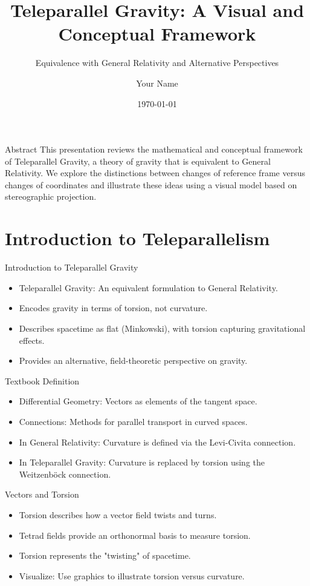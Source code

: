 \documentclass{beamer}
\title{Teleparallel Gravity: A Visual and Conceptual Framework}
\subtitle{Equivalence with General Relativity and Alternative Perspectives}
\author{Your Name}
\institute{Your Institution}
\date{\today}
\begin{document}
\begin{frame}
  \titlepage
\end{frame}

\begin{frame}{Abstract}
This presentation reviews the mathematical and conceptual framework of Teleparallel Gravity, a theory of gravity that is equivalent to General Relativity. We explore the distinctions between changes of reference frame versus changes of coordinates and illustrate these ideas using a visual model based on stereographic projection.
\end{frame}

\section{Introduction to Teleparallelism}

\begin{frame}{Introduction to Teleparallel Gravity}
  \begin{itemize}
    \item Teleparallel Gravity: An equivalent formulation to General Relativity.
    \item Encodes gravity in terms of torsion, not curvature.
    \item Describes spacetime as flat (Minkowski), with torsion capturing gravitational effects.
    \item Provides an alternative, field-theoretic perspective on gravity.
  \end{itemize}
\end{frame}

\begin{frame}{Textbook Definition}
  \begin{itemize}
    \item Differential Geometry: Vectors as elements of the tangent space.
    \item Connections: Methods for parallel transport in curved spaces.
    \item In General Relativity: Curvature is defined via the Levi-Civita connection.
    \item In Teleparallel Gravity: Curvature is replaced by torsion using the Weitzenböck connection.
  \end{itemize}
\end{frame}

\begin{frame}{Vectors and Torsion}
  \begin{itemize}
    \item Torsion describes how a vector field twists and turns.
    \item Tetrad fields provide an orthonormal basis to measure torsion.
    \item Torsion represents the "twisting" of spacetime.
    \item Visualize: Use graphics to illustrate torsion versus curvature.
  \end{itemize}
\end{frame}
\end{document}
